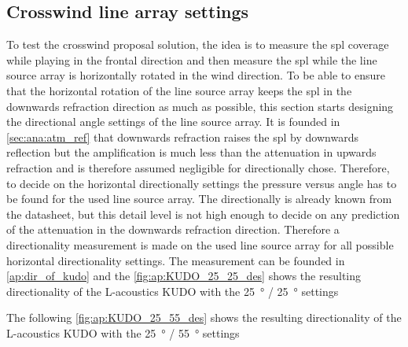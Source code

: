 \subsection{Crosswind line array settings} \label{sub:des:cros_set}
To test the crosswind proposal solution, the idea is to measure the \gls{spl} coverage while playing in the frontal direction and then measure the \gls{spl} while the line source array is horizontally rotated in the wind direction. To be able to ensure that the horizontal rotation of the line source array keeps the \gls{spl} in the downwards refraction direction as much as possible, this section starts designing the directional angle settings of the line source array. It is founded in \autoref{sec:ana:atm_ref} that downwards refraction raises the \gls{spl} by downwards reflection but the amplification is much less than the attenuation in upwards refraction and is therefore assumed negligible for directionally chose. Therefore, to decide on the horizontal directionally settings the pressure versus angle has to be found for the used line source array. The  directionally is already known from the datasheet, but this detail level is not high enough to decide on any prediction of the attenuation in the downwards refraction direction. Therefore a directionality measurement is made on the used line source array for all possible horizontal directionality settings. The measurement can be founded in \autoref{ap:dir_of_kudo} and the \autoref{fig:ap:KUDO_25_25_des} shows the resulting directionality of the L-acoustics KUDO with the \SI{25}{\degree} / \SI{25}{\degree} settings 


The following \autoref{fig:ap:KUDO_25_55_des} shows the resulting directionality of the L-acoustics KUDO with the \SI{25}{\degree} / \SI{55}{\degree} settings 


